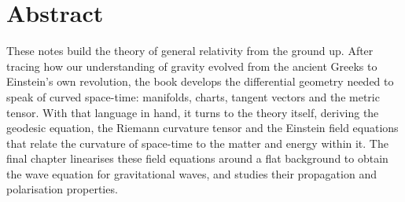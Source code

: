 \section*{Abstract}

    These notes build the theory of general relativity from the ground up. After tracing how our understanding of gravity evolved from the ancient Greeks to Einstein's own revolution, the book develops the differential geometry needed to speak of curved space-time: manifolds, charts, tangent vectors and the metric tensor. With that language in hand, it turns to the theory itself, deriving the geodesic equation, the Riemann curvature tensor and the Einstein field equations that relate the curvature of space-time to the matter and energy within it. The final chapter linearises these field equations around a flat background to obtain the wave equation for gravitational waves, and studies their propagation and polarisation properties.
